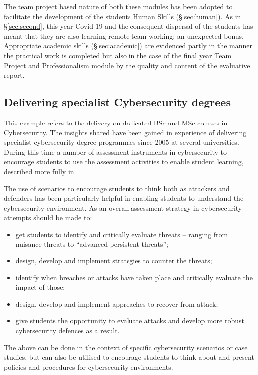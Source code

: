 \documentclass[conference]{IEEEtran}
\begin{document}
The team project based nature of both these modules has been adopted to facilitate the development of the students Human Skills (\S\ref{sec:human}). As in \S\ref{sec:second}, this year Covid-19 and the consequent dispersal of the students has meant that they are also learning remote team working: an unexpected bonus. Appropriate academic skills (\S\ref{sec:academic}) are evidenced partly in the manner the practical work is completed but also in the case of the final year Team Project and Professionalism module by the quality and content of the evaluative report.

\subsection{Delivering specialist Cybersecurity degrees}\label{sec:fourth} %
This example refers to the delivery on dedicated BSc and MSc courses in Cybersecurity. The insights shared have been gained in experience of delivering specialist cybersecurity degree programmes since 2005 at several universities. During this time a number of assessment instruments in cybersecurity to encourage students to use the assessment activities to enable student learning, described more fully in ~\cite{Irons2019a}

The use of scenarios to encourage students to think both as attackers and defenders has been particularly helpful in enabling students to understand the cybersecurity environment. As an overall assessment strategy in cybersecurity attempts should be made to: 
\begin{itemize}
\item get students to identify and critically evaluate threats – ranging from nuisance threats to “advanced persistent threats”;
\item design, develop and implement strategies to counter the threats;
\item identify when breaches or attacks have taken place and critically evaluate the impact of those;
\item design, develop and implement approaches to recover from attack;
\item give students the opportunity to evaluate attacks and develop more robust cybersecurity defences as a result.
\end{itemize}

The above can be done in the context of specific cybersecurity scenarios or case studies, but can also be utilised to encourage students to think about and present policies and procedures for cybersecurity environments. 
\end{document}
